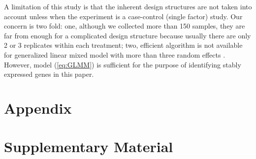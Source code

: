 \documentclass[letterpaper,12pt]{article}
\begin{document}
A limitation of this study is that the inherent design structures are not taken into account unless when the experiment is a case-control (single factor) study. Our concern is two fold: one, although we collected more than 150 samples, they are far from enough for a complicated design structure because usually there are only 2 or 3 replicates within each treatment;  two, efficient algorithm is not available for generalized linear mixed model with more than three random effects \citep{bolker2009generalized}. However, model (\ref{eq:GLMM}) is sufficient for the purpose of identifying stably expressed genes in this paper.



\section{Appendix}


\section{Supplementary Material}
\end{document}
